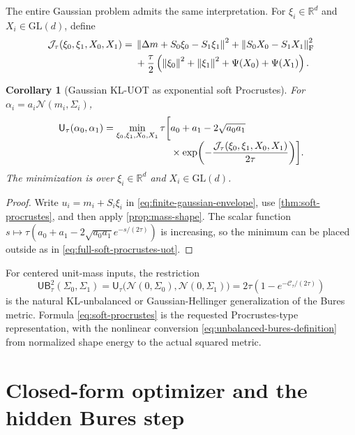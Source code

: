 \documentclass[11pt]{article}
\newtheorem{corollary}[theorem]{Corollary}
\theoremstyle{definition}
\theoremstyle{remark}
\newcommand{\R}{\mathbb R}
\newcommand{\UOT}{\mathsf U}
\newcommand{\UB}{\mathsf{UB}}
\newcommand{\cN}{\mathcal N}
\newcommand{\norm}[1]{\left\lVert #1\right\rVert}
\begin{document}
The entire Gaussian problem admits the same interpretation. For
$\xi_i\in\R^d$ and $X_i\in\mathrm{GL}(d)$, define
\begin{align}
 \mathcal J_\tau(\xi_0,\xi_1,X_0,X_1)
 ={}&\norm{\Delta m+S_0\xi_0-S_1\xi_1}^2
 +\norm{S_0X_0-S_1X_1}_{\mathrm F}^2\notag\\
 &+\frac\tau2\left(
   \norm{\xi_0}^2+\norm{\xi_1}^2
   +\Psi(X_0)+\Psi(X_1)
 \right).
 \label{eq:full-soft-procrustes-energy}
\end{align}

\begin{corollary}[Gaussian KL-UOT as exponential soft Procrustes]
\label{cor:full-soft-procrustes}
For $\alpha_i=a_i\cN(m_i,\Sigma_i)$,
\begin{align}
 \UOT_\tau(\alpha_0,\alpha_1)
 =\min_{\xi_0,\xi_1,X_0,X_1}
 \tau\biggl[&a_0+a_1
 -2\sqrt{a_0a_1}\notag\\[-1mm]
 &\times\exp\!\left(
   -\frac{\mathcal J_\tau(\xi_0,\xi_1,X_0,X_1)}{2\tau}
 \right)\biggr].
 \label{eq:full-soft-procrustes-uot}
\end{align}
The minimization is over $\xi_i\in\R^d$ and $X_i\in\mathrm{GL}(d)$.
\end{corollary}

\begin{proof}
Write $u_i=m_i+S_i\xi_i$ in
\eqref{eq:finite-gaussian-envelope}, use
\cref{thm:soft-procrustes}, and then apply
\cref{prop:mass-shape}. The scalar function
$s\mapsto\tau(a_0+a_1-2\sqrt{a_0a_1}e^{-s/(2\tau)})$ is increasing, so the
minimum can be placed outside as in \eqref{eq:full-soft-procrustes-uot}.
\end{proof}

For centered unit-mass inputs, the restriction
\begin{equation}\label{eq:unbalanced-bures-definition}
 \UB_\tau^2(\Sigma_0,\Sigma_1)
 =\UOT_\tau\bigl(\cN(0,\Sigma_0),\cN(0,\Sigma_1)\bigr)
 =2\tau\left(1-e^{-\mathcal C_\tau/(2\tau)}\right)
\end{equation}
is the natural KL-unbalanced or Gaussian-Hellinger generalization of the
Bures metric. Formula \eqref{eq:soft-procrustes} is the requested
Procrustes-type representation, with the nonlinear conversion
\eqref{eq:unbalanced-bures-definition} from normalized shape energy to the
actual squared metric.

\section{Closed-form optimizer and the hidden Bures step}
\end{document}
